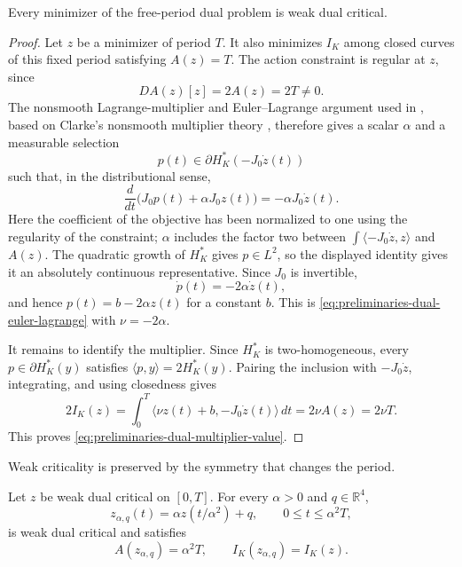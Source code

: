 \begin{lemma}
\label{lem:preliminaries-dual-euler-lagrange}
Every minimizer of the free-period dual problem is weak dual critical.
\end{lemma}

\begin{proof}
Let \(z\) be a minimizer of period \(T\).  It also minimizes \(I_K\) among
closed curves of this fixed period satisfying \(A(z)=T\).  The action
constraint is regular at \(z\), since
\[
  DA(z)[z]=2A(z)=2T\neq0.
\]
The nonsmooth Lagrange-multiplier and Euler--Lagrange argument used in
\cite[Lemma~5.2]{AAO2014}, based on Clarke's nonsmooth multiplier theory
\cite[Ch.~5]{Clarke1983}, therefore gives a scalar \(\alpha\) and a measurable
selection
\[
  p(t)\in\partial H_K^*(-J_0\dot z(t))
\]
such that, in the distributional sense,
\[
  \frac{d}{dt}\bigl(J_0p(t)+\alpha J_0z(t)\bigr)
  =-\alpha J_0\dot z(t).
\]
Here the coefficient of the objective has been normalized to one using the
regularity of the constraint; \(\alpha\) includes the factor two between
\(\int\langle-J_0\dot z,z\rangle\) and \(A(z)\).  The quadratic growth of
\(H_K^*\) gives \(p\in L^2\), so the displayed identity gives it an absolutely
continuous representative.  Since \(J_0\) is invertible,
\[
  \dot p(t)=-2\alpha\dot z(t),
\]
and hence \(p(t)=b-2\alpha z(t)\) for a constant \(b\).  This is
\eqref{eq:preliminaries-dual-euler-lagrange} with \(\nu=-2\alpha\).

It remains to identify the multiplier.  Since \(H_K^*\) is
two-homogeneous, every \(p\in\partial H_K^*(y)\) satisfies
\(\langle p,y\rangle=2H_K^*(y)\).  Pairing the inclusion with
\(-J_0\dot z\), integrating, and using closedness gives
\[
  2I_K(z)
  =\int_0^T\langle\nu z(t)+b,-J_0\dot z(t)\rangle\,dt
  =2\nu A(z)
  =2\nu T.
\]
This proves \eqref{eq:preliminaries-dual-multiplier-value}.
\end{proof}

Weak criticality is preserved by the symmetry that changes the period.

\begin{lemma}
\label{lem:preliminaries-dual-symmetry}
Let \(z\) be weak dual critical on \([0,T]\).  For every \(\alpha>0\) and
\(q\in\mathbb R^4\),
\[
  z_{\alpha,q}(t)=\alpha z(t/\alpha^2)+q,
  \qquad 0\leq t\leq\alpha^2T,
\]
is weak dual critical and satisfies
\[
  A(z_{\alpha,q})=\alpha^2T,
  \qquad I_K(z_{\alpha,q})=I_K(z).
\]
\end{lemma}

